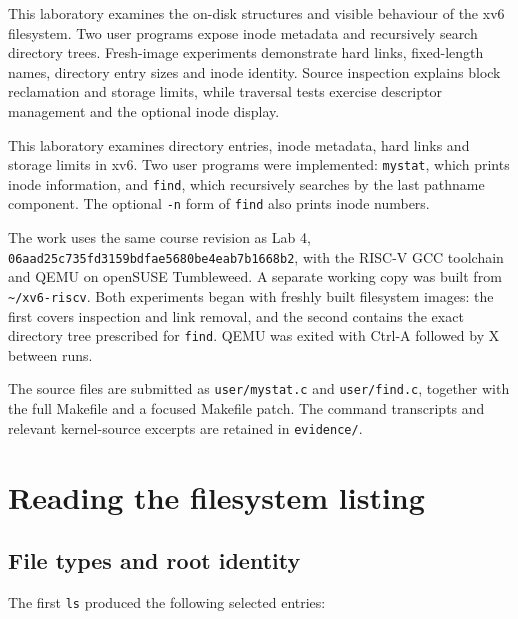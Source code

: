 \documentclass{../latex/utmreport}
\begin{document}
\makeutmreporttitlepage
\tableofcontents
\clearpage
\begin{utmabstract}[Abstract]
This laboratory examines the on-disk structures and visible behaviour of the xv6 filesystem. Two user programs expose inode metadata and recursively search directory trees. Fresh-image experiments demonstrate hard links, fixed-length names, directory entry sizes and inode identity. Source inspection explains block reclamation and storage limits, while traversal tests exercise descriptor management and the optional inode display.
\end{utmabstract}
\utmintroduction

This laboratory examines directory entries, inode metadata, hard links
and storage limits in xv6. Two user programs were implemented:
\texttt{mystat}, which prints inode information, and \texttt{find},
which recursively searches by the last pathname component. The optional
\texttt{-n} form of \texttt{find} also prints inode numbers.

The work uses the same course revision as Lab 4,
{\small\texttt{06aad25c735fd3159bdfae5680be4eab7b1668b2}}, with the RISC-V GCC
toolchain and QEMU on openSUSE Tumbleweed. A separate working copy was
built from \texttt{\textasciitilde{}/xv6-riscv}. Both experiments began
with freshly built filesystem images: the first covers inspection and
link removal, and the second contains the exact directory tree
prescribed for \texttt{find}. QEMU was exited with Ctrl-A followed by X
between runs.

The source files are submitted as \texttt{user/mystat.c} and
\texttt{user/find.c}, together with the full Makefile and a focused
Makefile patch. The command transcripts and relevant kernel-source
excerpts are retained in \texttt{evidence/}.

\chapter{Reading the filesystem
listing}\label{reading-the-filesystem-listing}

\section{File types and root
identity}\label{file-types-and-root-identity}

The first \texttt{ls} produced the following selected entries:
\end{document}
